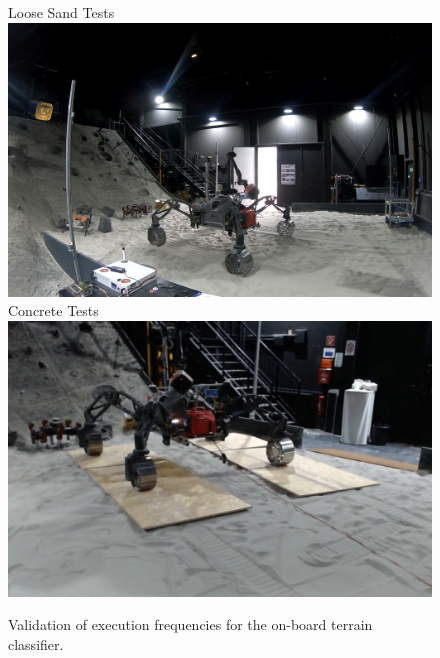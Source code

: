 \begin{figure}[!htbp]
    \centering
    \subcaptionbox
        {Loose Sand Tests}
        {
        \includegraphics[width=\columnwidth]{../figures/spacehall.png}
        }
    \subcaptionbox
        {Concrete Tests}
        {\includegraphics[width=\columnwidth]{../figures/spacehallconcrete.png}}
    \caption{Validation of execution frequencies for the on-board terrain classifier.}
    \label{fig:sh-tests}
\end{figure}

